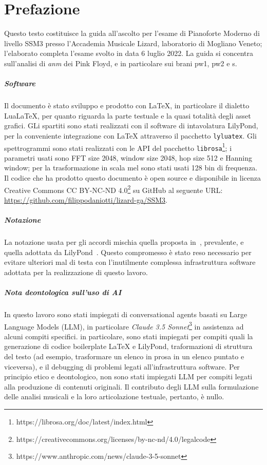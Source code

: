 \documentclass[class=book, crop=false, oneside, 12pt]{standalone}
\begin{document}
\chapter*{Prefazione}

Questo testo costituisce la guida all'ascolto per l'esame di Pianoforte Moderno di livello SSM3 presso l'Accademia Musicale Lizard, laboratorio di Mogliano Veneto; l'elaborato completa l'esame svolto in data 6 luglio 2022. La guida si concentra sull'analisi di \emph{\acrlong{anm}} dei Pink Floyd, e in particolare sui brani \acrlong{pw1}, \acrlong{pw2} e \acrlong{s}.

\paragraph{Software}
Il documento è stato sviluppo e prodotto con LaTeX, in particolare il dialetto LuaLaTeX, per quanto riguarda la parte testuale e la quasi totalità degli asset grafici. GLi spartiti sono stati realizzati con il software di intavolatura LilyPond, per la conveniente integrazione con LaTeX attraverso il pacchetto \texttt{lyluatex}. Gli spettrogrammi sono stati realizzati con le API del pacchetto \texttt{librosa}\footnote{https://librosa.org/doc/latest/index.html}; i parametri usati sono FFT size 2048, window size 2048, hop size 512 e Hanning window; per la trasformazione in scala mel sono stati usati 128 bin di frequenza. Il codice che ha prodotto questo documento è open source e disponibile in licenza Creative Commons CC BY-NC-ND 4.0\footnote{https://creativecommons.org/licenses/by-nc-nd/4.0/legalcode} su GitHub al seguente URL: \url{https://github.com/filippodaniotti/lizard-ga/SSM3}.

\paragraph{Notazione}
La notazione usata per gli accordi mischia quella proposta in~\cite{brachi2008armonia}, prevalente, e quella adottata da LilyPond~\cite{res:lily-chord-chart}. Questo compromesso è stato reso necessario per evitare ulteriori mal di testa con l'inutilmente complessa infrastruttura software adottata per la realizzazione di questo lavoro.

\paragraph{Nota deontologica sull'uso di AI}
In questo lavoro sono stati impiegati di conversational agents basati su Large Language Models (LLM), in particolare \emph{Claude 3.5 Sonnet}\footnote{https://www.anthropic.com/news/claude-3-5-sonnet} in assistenza ad alcuni compiti specifici. in particolare, sono stati impiegati per compiti quali la generazione di codice boilerplate LaTeX e LilyPond, traformazioni di struttura del testo (ad esempio, trasformare un elenco in prosa in un elenco puntato e viceversa), e il debugging di problemi legati all'infrastruttura software. Per principio etico e deontologico, non sono stati impiegati LLM per compiti legati alla produzione di contenuti originali. Il contributo degli LLM sulla formulazione delle analisi musicali e la loro articolazione testuale, pertanto, è nullo.
\end{document}

